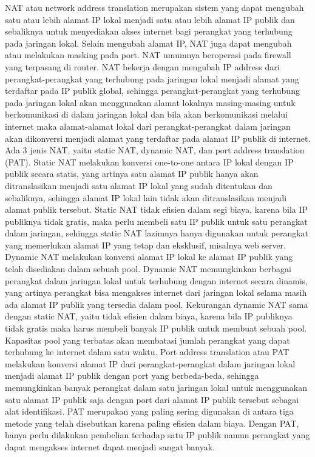 NAT atau network address translation merupakan sistem yang dapat mengubah satu atau lebih alamat IP lokal menjadi satu atau lebih alamat IP publik dan sebaliknya untuk menyediakan akses internet bagi perangkat yang terhubung pada jaringan lokal. Selain mengubah alamat IP, NAT juga dapat mengubah atau melakukan masking pada port. NAT umumnya beroperasi pada firewall yang terpasang di router. NAT bekerja dengan mengubah IP address dari perangkat-perangkat yang terhubung pada jaringan lokal menjadi alamat yang terdaftar pada IP publik global, sehingga perangkat-perangkat yang terhubung pada jaringan lokal akan menggunakan alamat lokalnya masing-masing untuk berkomunikasi di dalam jaringan lokal dan bila akan berkomunikasi melalui internet maka alamat-alamat lokal dari perangkat-perangkat dalam jaringan akan dikonversi menjadi alamat yang terdaftar pada alamat IP publik di internet. Ada 3 jenis NAT, yaitu static NAT, dynamic NAT, dan port address translation (PAT). Static NAT melakukan konversi one-to-one antara IP lokal dengan IP publik secara statis, yang artinya satu alamat IP publik hanya akan ditranslasikan menjadi satu alamat IP lokal yang sudah ditentukan dan sebaliknya, sehingga alamat IP lokal lain tidak akan ditranslasikan menjadi alamat publik tersebut. Static NAT tidak efisien dalam segi biaya, karena bila IP publiknya tidak gratis, maka perlu membeli satu IP publik untuk satu perangkat dalam jaringan, sehingga static NAT lazimnya hanya digunakan untuk perangkat yang memerlukan alamat IP yang tetap dan eksklusif, misalnya web server. Dynamic NAT melakukan konversi alamat IP lokal ke alamat IP publik yang telah disediakan dalam sebuah pool. Dynamic NAT memungkinkan berbagai perangkat dalam jaringan lokal untuk terhubung dengan internet secara dinamis, yang artinya perangkat bisa mengakses internet dari jaringan lokal selama masih ada alamat IP publik yang tersedia dalam pool. Kekurangan dynamic NAT sama dengan static NAT, yaitu tidak efisien dalam biaya, karena bila IP publiknya tidak gratis maka harus membeli banyak IP publik untuk membuat sebuah pool. Kapasitas pool yang terbatas akan membatasi jumlah perangkat yang dapat terhubung ke internet dalam satu waktu. Port address translation atau PAT melakukan konversi alamat IP dari perangkat-perangkat dalam jaringan lokal menjadi alamat IP publik dengan port yang berbeda-beda, sehingga memungkinkan banyak perangkat dalam satu jaringan lokal untuk menggunakan satu alamat IP publik saja dengan port dari alamat IP publik tersebut sebagai alat identifikasi. PAT merupakan yang paling sering digunakan di antara tiga metode yang telah disebutkan karena paling efisien dalam biaya. Dengan PAT, hanya perlu dilakukan pembelian terhadap satu IP publik namun perangkat yang dapat mengakses internet dapat menjadi sangat banyak.

